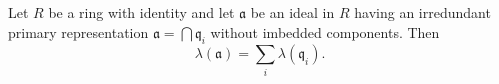 Let $R$ be a ring with identity and let $\mathfrak{a}$ be an ideal in $R$ having an irredundant primary representation $\mathfrak{a} = \bigcap \mathfrak{q}_i$ without imbedded components. Then
$$\lambda(\mathfrak{a}) = \sum_i \lambda(\mathfrak{q}_i).$$
